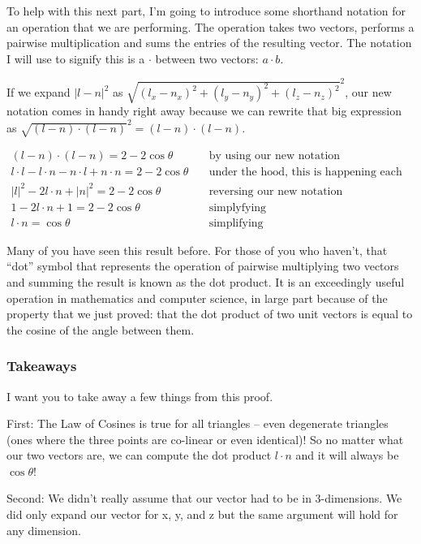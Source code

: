 \documentclass{article}
\begin{document}
To help with this next part, I'm going to introduce some shorthand notation for an operation that we are performing.
The operation takes two vectors, performs a pairwise multiplication and sums the entries of the resulting vector.
The notation I will use to signify this is a $\cdot$ between two vectors: $a \cdot b$.

If we expand $|l - n|^2$ as $\sqrt{(l_x - n_x)^2 + (l_y - n_y)^2 + (l_z - n_z)^2} ^2$, our new notation comes in handy right away because we can rewrite that big expression as $\sqrt{(l - n) \cdot (l - n)}^2 = (l-n) \cdot (l - n)$.

\begin{align*}
(l - n) \cdot (l - n) = 2 - 2 \cos \theta & \quad \text{by using our new notation} \\
l \cdot l - l \cdot n - n \cdot l + n \cdot n = 2 - 2 \cos \theta & \quad \text{under the hood, this is happening each dimension and this is the result} \\
|l|^2 - 2 l \cdot n + |n|^2 = 2 - 2 \cos \theta & \quad \text{reversing our new notation} \\
1 - 2 l \cdot n + 1 = 2 - 2 \cos \theta & \quad \text{simplyfying} \\
l \cdot n = \cos \theta & \quad \text{simplifying}
\end{align*}

Many of you have seen this result before.
For those of you who haven't, that ``dot'' symbol that represents the operation of pairwise multiplying two vectors and summing the result is known as the dot product.
It is an exceedingly useful operation in mathematics and computer science, in large part because of the property that we just proved: that the dot product of two unit vectors is equal to the cosine of the angle between them.

\subsubsection{Takeaways}

I want you to take away a few things from this proof.

First: The Law of Cosines is true for all triangles -- even degenerate triangles (ones where the three points are co-linear or even identical)!
So no matter what our two vectors are, we can compute the dot product $l \cdot n$ and it will always be $\cos \theta$!

Second: We didn't really assume that our vector had to be in 3-dimensions.
We did only expand our vector for x, y, and z but the same argument will hold for any dimension.
\end{document}
